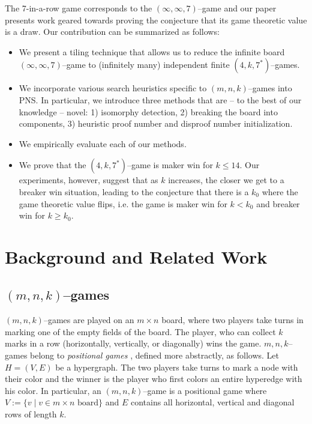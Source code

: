 \documentclass[conference]{IEEEtran}
\theoremstyle{definition}
\begin{document}
The 7-in-a-row game corresponds to the $(\infty, \infty, 7)$--game and our paper presents work geared towards proving the conjecture that its game theoretic value is a draw. Our contribution can be summarized as follows:
\begin{itemize}
    \item We present a tiling technique that allows us to reduce the infinite board $(\infty,\infty,7)$--game to (infinitely many) independent finite $(4,k,7^*)$--games.
    \item We incorporate various search heuristics specific to $(m,n,k)$--games into PNS. In particular, we introduce three methods that are -- to the best of our knowledge -- novel: 1) isomorphy detection, 2) breaking the board into components, 3) heuristic proof number and disproof number initialization.
    \item  We empirically evaluate each of our methods.
    \item We prove that the $(4,k,7^*)$--game is maker win for $k \leq 14$. Our experiments, however, suggest that as $k$ increases, the closer we get to a breaker win situation, leading to the conjecture that there is a $k_0$ where the game theoretic value flips, i.e. the game is maker win for $k < k_0$ and breaker win for $k \geq k_0$.
\end{itemize}



\section{Background and Related Work}
\label{sec:background}

\subsection{$(m,n,k)$--games}
$(m,n,k)$--games are played on an $m \times n$ board, where two players take turns in marking one of the empty fields of the board. The player, who can collect $k$ marks in a row (horizontally, vertically, or diagonally) wins the game. $m,n,k$--games belong to \emph{positional games} \cite{BECK1981117}, defined more abstractly, as follows. Let $H=(V,E)$ be a hypergraph. The two players take turns to mark a node with their color and the winner is the player who first colors an entire hyperedge with his color. In particular, an $(m,n,k)$--game is a positional game where $V:=\{v \mid v \in m \times n \text{ board}\}$ and $E$ contains all horizontal, vertical and diagonal rows of length $k$. 
\end{document}
